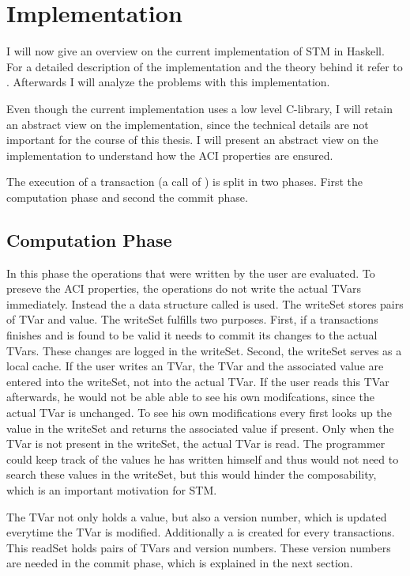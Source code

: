   
\section{Implementation}
I will now give an overview on the current implementation of STM in Haskell. For a detailed description of the implementation and the theory behind it
refer to \parencite{STMBase}. Afterwards I will analyze the problems with this implementation.

Even though the current implementation uses a low level C-library, I will retain an abstract view on the implementation, since the technical 
details are not important for the course of this thesis. I will present an abstract view on the implementation to understand how the ACI 
properties are ensured.

The execution of a transaction (a call of ) is split in two phases. First the computation phase and second the commit phase. 
 
\subsection{Computation Phase}
In this phase the operations that were written by the user are evaluated. To preseve the ACI properties, the  
operations do not write the actual TVars immediately. Instead the a data structure called  is used. The 
writeSet stores pairs of TVar and value. The 
writeSet fulfills two purposes. First, if a transactions finishes and is found to be valid it needs to commit its changes to the 
actual TVars. These changes are logged in the writeSet. Second, the writeSet serves as a local cache. If the user writes an TVar, 
the TVar and the associated value are entered into the writeSet, not into the actual TVar. If the user reads this TVar afterwards, he 
would not be able able to see his own modifcations, since the actual TVar is unchanged. To see his own modifications every 
 first looks up the value in the writeSet and returns the associated value if present. Only when the TVar is not 
present in the writeSet, the actual TVar is read. The programmer could keep track of the values he has written himself and thus 
would not need to search these values in the writeSet, but this would hinder the composability, which is an important motivation
for STM.

The TVar not only holds a value, but also a version number, which is updated everytime the TVar is modified.
Additionally a  is created for every transactions. This readSet holds pairs of TVars and version numbers. These
version numbers are needed in the commit phase, which is explained in the next section.

